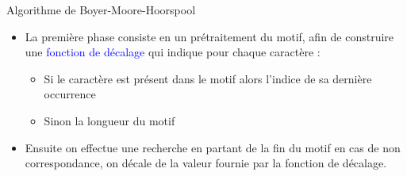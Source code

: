 \documentclass[10pt]{beamer}
\begin{document}
\begin{frame}{\Ctitle}{\stitle}
	\begin{block}{Algorithme de Boyer-Moore-Hoorspool}
		\begin{itemize}
		\item<1-> La première phase consiste en un prétraitement du motif, afin de construire une \textcolor{blue}{fonction de décalage} qui indique pour chaque caractère :
		\begin{itemize}
			\item<1-> Si le caractère est présent dans le motif alors l'indice de sa dernière occurrence 
			\item<2-> Sinon la longueur du motif
		\end{itemize}
		\item<2-> Ensuite on effectue une recherche en partant de la fin du motif en cas de non correspondance, on décale de la valeur fournie par la fonction de décalage.
	\end{itemize}
	\end{block}
\end{frame}
\end{document}
